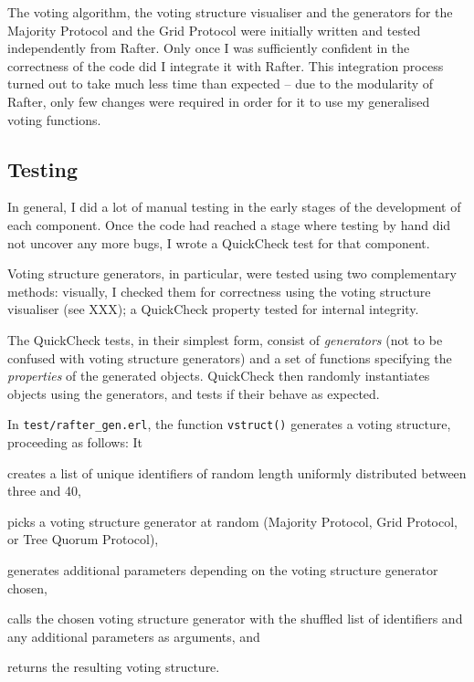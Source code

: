 \documentclass[draft,11pt,chapterprefix=true,toc=bibliography,numbers=noendperiod,
               footnotes=multiple,twoside]{scrreprt}
\begin{document}
The voting algorithm, the voting structure visualiser and the generators for the Majority Protocol and the Grid Protocol were initially written and tested independently from Rafter. Only once I was sufficiently confident in the correctness of the code did I integrate it with Rafter. This integration process turned out to take much less time than expected -- due to the modularity of Rafter, only few changes were required in order for it to use my generalised voting functions.

\subsection{Testing}

In general, I did a lot of manual testing in the early stages of the development of each component. Once the code had reached a stage where testing by hand did not uncover any more bugs, I wrote a QuickCheck test for that component.

Voting structure generators, in particular, were tested using two complementary methods: visually, I checked them for correctness using the voting structure visualiser (see XXX); a QuickCheck property tested for internal integrity.

The QuickCheck tests, in their simplest form, consist of \emph{generators} (not to be confused with voting structure generators) and a set of functions specifying the \emph{properties} of the generated objects. QuickCheck then randomly instantiates objects using the generators, and tests if their behave as expected.


In \texttt{test/rafter\_gen.erl}, the function \texttt{vstruct()} generates a voting structure, proceeding as follows: It
\begin{inparaenum}[(a)]
    \item creates a list of unique identifiers of random length uniformly distributed between three and 40,
    \item picks a voting structure generator at random (Majority Protocol, Grid Protocol, or Tree Quorum Protocol),
    \item generates additional parameters depending on the voting structure generator chosen,
    \item calls the chosen voting structure generator with the shuffled list of identifiers and any additional parameters as arguments, and
    \item returns the resulting voting structure.
\end{inparaenum}
\end{document}
